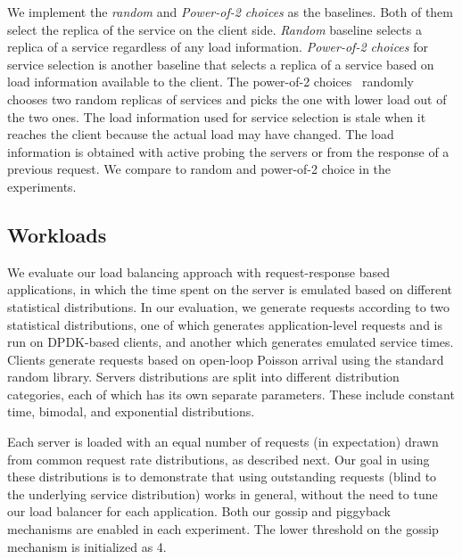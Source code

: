 We implement the \textit{random} and \textit{Power-of-2 choices} as the baselines. 
%
Both of them select the replica of the service on the client side. 
%
\textit{Random} baseline selects a replica of a service regardless of any load information.
%
\textit{Power-of-2 choices} for service selection is another baseline that selects a replica of a service based on load information available to the client.
%
The power-of-2 choices~\cite{power-of-two:tpds:2001} randomly chooses two random replicas of services and picks the one with lower load out of the two ones.   
%
The load information used for service selection is stale when it reaches the client because the actual load may have changed.
%
The load information is obtained with active probing the servers or from the response of a previous request.
%
%
We compare \daronpon to random and power-of-2 choice in
the experiments.

\subsection{Workloads}
%
We evaluate our load balancing approach with request-response based 
applications, in which the time spent on the server is emulated based on 
different statistical distributions.
%
In our evaluation, we generate requests according to two
statistical distributions, one of which generates application-level requests
and is run on DPDK-based clients, and another which generates emulated service
times. 
%
Clients generate requests based on open-loop Poisson arrival using the
standard random library.  
%
Servers distributions are split into different distribution categories, each of which has its own separate parameters. 
%
These include constant time, bimodal, and exponential distributions. 

Each server is loaded with an equal number of requests (in expectation)
drawn from common request rate distributions, as described next.
Our goal in using these distributions is to demonstrate that
using outstanding requests (blind to the underlying
service distribution) works in general, without the need to tune
our load balancer for each application.  
%
Both our gossip and piggyback mechanisms are enabled in each experiment. 
%
The lower threshold on the gossip mechanism is initialized as 4.

